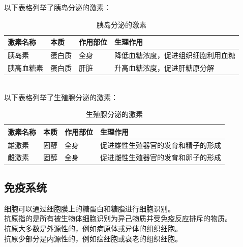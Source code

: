\documentclass[UTF8]{ctexart}
\begin{document}
    以下表格列举了胰岛分泌的激素：\vspace{5pt}
    \begin{table}[h!]
        \begin{center}
            \begin{tabular}{l|l|l|l}
                \hline
                激素名称\qquad\qquad&本质\qquad\qquad&作用部位\qquad\qquad&生理作用\qquad\qquad\\ \hline
                胰岛素&蛋白质&全身&降低血糖浓度，促进组织细胞利用血糖\\ \hline
                胰高血糖素&蛋白质&肝脏&升高血糖浓度，促进肝糖原分解\\ \hline
            \end{tabular}
            \caption{胰岛分泌的激素}
        \end{center}
    \end{table}\\
    以下表格列举了生殖腺分泌的激素：\vspace{5pt}
    \begin{table}[h!]
        \begin{center}
            \begin{tabular}{l|l|l|l}
                \hline
                激素名称\qquad\qquad&本质\qquad\qquad&作用部位\qquad\qquad&生理作用\qquad\qquad\\ \hline
                雄激素&固醇&全身&促进雄性生殖器官的发育和精子的形成\\ \hline
                雌激素&固醇&全身&促进雌性生殖器官的发育和卵子的形成\\ \hline
            \end{tabular}
            \caption{生殖腺分泌的激素}
        \end{center}
    \end{table}

\newpage

\subsection{免疫系统}
    细胞可以通过细胞膜上的糖蛋白和糖脂进行细胞识别。\\[3mm]
    抗原指的是所有被生物体细胞识别为异己物质并受免疫反应排斥的物质。\\[3mm]
    抗原大多数是外源性的，例如病原体或异体的组织细胞。\\[3mm]
    抗原少部分是内源性的，例如癌细胞或衰老的组织细胞。
\end{document}
